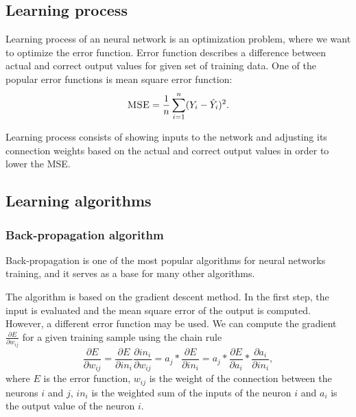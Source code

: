\subsection{Learning process}
Learning process of an neural network is an optimization problem, where we want to optimize the error function. Error function describes a difference between actual and correct  output values for given set of training data. One of the popular error functions is mean square error function:
\[
\textsc{MSE} = \frac{1}{n} \sum_{i=1}^{n} (Y_{i} - \hat{Y}_{i})^2.
\]

Learning process consists of showing inputs to the network and adjusting its connection weights based on the actual and correct output values in order to lower the \textsc{MSE}.

\subsection{Learning algorithms}

\subsubsection{Back-propagation algorithm}
Back-propagation is one of the most popular algorithms for neural networks training, and it serves as a base for many other algorithms.

The algorithm is based on the gradient descent method. In the first step, the input is evaluated and the mean square error of the output is computed. However, a different error function may be used. We can compute the gradient $\frac{\partial E}{\partial w_{ij}}$ for a given training sample using the chain rule
\[
\frac{\partial E}{\partial w_{ij}} = \frac{\partial E}{\partial in_{i}} \frac{\partial in_{i}}{\partial w_{ij}} = 
a_{j}*\frac{\partial E}{\partial in_{i}} = a_{j}*\frac{\partial E}{\partial a_{i}}*\frac{\partial a_{i}}{\partial in_{i}},
\]
where $E$ is the error function, $w_{ij}$ is the weight of the connection between the neurons $i$ and $j$, $in_{i}$ is the weighted sum of the inputs of the neuron $i$ and $a_{i}$ is the output value of the neuron $i$.


